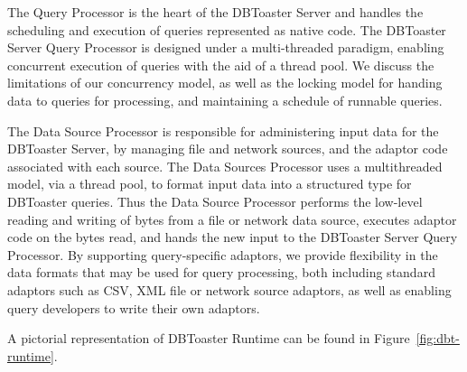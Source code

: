 \documentclass[14pt]{article}
\newcommand{\comment}[1]{}
\begin{document}
The Query Processor is the heart of the DBToaster Server and handles the
scheduling and execution of queries represented as native code. The DBToaster
Server Query Processor is designed under a multi-threaded paradigm, enabling
concurrent execution of queries with the aid of a thread pool.  We discuss the
limitations of our concurrency model, as well as the locking model for handing
data to queries for processing, and maintaining a schedule of runnable queries.

The Data Source Processor is responsible for administering input data for the
DBToaster Server, by managing file and network sources, and the adaptor code
associated with each source. The Data Sources Processor uses a multithreaded
model, via a thread pool, to format input data into a structured type for
DBToaster queries. Thus the Data Source Processor performs the low-level reading
and writing of bytes from a file or network data source, executes adaptor code
on the bytes read, and hands the new input to the DBToaster Server Query
Processor. By supporting query-specific adaptors, we provide flexibility in the
data formats that may be used for query processing, both including standard
adaptors such as CSV, XML file or network source adaptors, as well as enabling
query developers to write their own adaptors.

A pictorial representation of DBToaster Runtime can be found in Figure~\ref{fig:dbt-runtime}.

\comment{
DBToaster Server consists of three major components: Compiler, Query Processor
and Data Sources Processor. Each of these components also interacts with each
other. The complete representation of DBToaster Runtime can be found in figure
\ref{fig:dbt-runtime}.

Each of three components interacts with external environment. Compiler and Query
Processor both implement a server to interact with users. Compiler receives SQL
queries and data adaptors. Query Processor uses server to distribute query
results to users. Data Sources Processor creates user specified clients to
receive data from a variety of sources.
}

\comment{
Compiler receives requests from the client to instantiate a Data Source Reader
for receiving data or a SQL query to process data. The created Data Reader is
passed to the Data Source Processor and a Query is passed to Query Processor to
run on the data.
}
\end{document}
